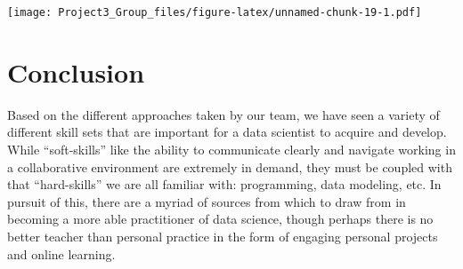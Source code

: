 \documentclass[]{article}
\begin{document}
\texttt{[image: Project3\_Group\_files/figure-latex/unnamed-chunk-19-1.pdf]}

\hypertarget{conclusion}{%
\section{Conclusion}\label{conclusion}}

Based on the different approaches taken by our team, we have seen a
variety of different skill sets that are important for a data scientist
to acquire and develop. While ``soft-skills'' like the ability to
communicate clearly and navigate working in a collaborative environment
are extremely in demand, they must be coupled with that ``hard-skills''
we are all familiar with: programming, data modeling, etc. In pursuit of
this, there are a myriad of sources from which to draw from in becoming
a more able practitioner of data science, though perhaps there is no
better teacher than personal practice in the form of engaging personal
projects and online learning.
\end{document}
